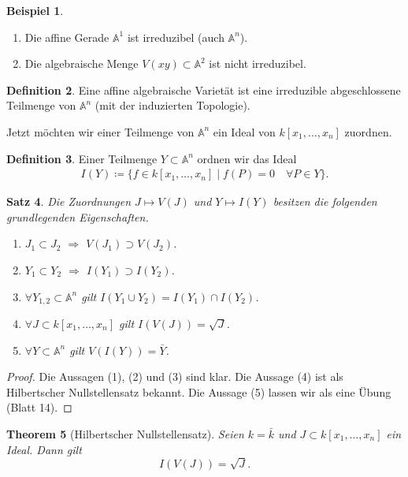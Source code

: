 \documentclass[reqno,12pt]{article}
\numberwithin{equation}{section}
\newcommand{\bA}{\mathbb{A}}
\theoremstyle{plain}
\newtheorem{thm}{Theorem}[section]
\newtheorem{proposition}[thm]{Satz}
\theoremstyle{definition}
\newtheorem{definition}[thm]{Definition}
\newtheorem{example}[thm]{Beispiel}
\begin{document}
\begin{example}

\begin{enumerate}
\item Die {\sf affine Gerade} $\bA^1$ ist irreduzibel (auch $\bA^n$).
\item Die algebraische Menge $V(xy) \subset \bA^2$ ist nicht irreduzibel.
\end{enumerate}
\end{example}


\begin{definition}
Eine {\sf affine algebraische Varietät} ist eine irreduzible abgeschlossene Teilmenge von $\bA^n$ (mit der induzierten Topologie).
\end{definition}


Jetzt möchten wir einer Teilmenge von $\bA^n$ ein Ideal von $k[x_1, \dots, x_n]$ zuordnen.
\begin{definition}
Einer Teilmenge $Y \subset \bA^n$ ordnen wir das Ideal
\begin{align*}
I(Y) \coloneqq \{f \in k[x_1, \dots, x_n] \mid f(P) = 0 \quad \forall P \in Y\}.
\end{align*}
\end{definition}


\begin{proposition}
Die Zuordnungen $J \mapsto V(J)$ und $Y \mapsto I(Y)$ besitzen die folgenden grundlegenden Eigenschaften.
\begin{enumerate}
\item $J_1 \subset J_2$ $\Rightarrow$ $V(J_1) \supset V(J_2)$.
\item $Y_1 \subset Y_2$ $\Rightarrow$ $I(Y_1) \supset I(Y_2)$.
\item $\forall Y_{1,2} \subset \bA^n$ gilt $I(Y_1 \cup Y_2) = I(Y_1) \cap I(Y_2)$.
\item $\forall J \subset k[x_1, \dots, x_n]$ gilt $I(V(J)) = \sqrt{J}$.
\item $\forall Y \subset \bA^n$ gilt $V(I(Y)) = \bar{Y}$.
\end{enumerate}
\end{proposition}

\begin{proof}
Die Aussagen (1), (2) und (3) sind klar. Die Aussage (4) ist als Hilbertscher Nullstellensatz bekannt. Die Aussage (5) lassen wir als eine Übung (Blatt 14).
\end{proof}

\begin{thm}[Hilbertscher Nullstellensatz]
Seien $k = \bar{k}$ und $J \subset k[x_1, \dots, x_n]$ ein Ideal. Dann gilt
$$
I(V(J)) = \sqrt{J}.
$$
\end{thm}
\end{document}
